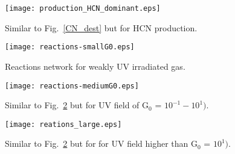 \documentclass{aa}
\begin{document}
\begin{appendix}
\begin{figure}
\texttt{[image: production\_HCN\_dominant.eps]}
\caption{Similar to Fig.~\ref{CN_dest} but for HCN production.}
\label{HCN_prod}
\end{figure}

\begin{figure}
\texttt{[image: reactions-smallG0.eps]}
\caption{Reactions network for weakly UV irradiated gas.}
\label{reactions_smallG0}
\end{figure}

\begin{figure}
\texttt{[image: reactions-mediumG0.eps]}
\caption{Similar to Fig.~\ref{reactions_smallG0} but for UV field of G$_0$ = $10^{-1} - 10^{1})$.}
\label{reactions_mediumG0}
\end{figure}

\begin{figure}
\texttt{[image: reations\_large.eps]}
\caption{Similar to Fig.~\ref{reactions_smallG0} but for for UV field higher than G$_0$ = $10^{1})$.}
\label{reactions_largeG0}
\end{figure}


\end{appendix}
\end{document}
